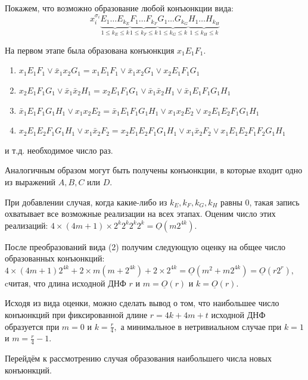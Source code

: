 \documentclass[12pt,a4paper,oneside,fleqn,leqno]{article}
\theoremstyle{definition}
\begin{document}
			Покажем, что возможно образование любой конъюнкции вида:
			$$
			x_i^{\sigma_i} \underbrace{E_1\ldots E_{k_E}}_{1\leqslant k_E \leqslant k}\underbrace{F_1\ldots F_{k_F}}_{1\leqslant k_F \leqslant k}\underbrace{G_1\ldots G_{k_G}}_{1\leqslant k_G \leqslant k}\underbrace{H_1\ldots H_{k_H}}_{1\leqslant k_H \leqslant k}$$\par
			На первом этапе была образована конъюнкция $x_1E_1F_1.$
			\begin{enumerate}\itemsep=0pt
				\item
				$x_1E_1F_1 \vee \bar{x}_1x_2G_1 = x_1E_1F_1 \vee \bar{x}_1x_2G_1 \vee x_2E_1F_1G_1$
				\item
				$x_2E_1F_1G_1 \vee \bar{x}_1\bar{x}_2H_1 = x_2E_1F_1G_1 \vee \bar{x}_1\bar{x}_2H_1 \vee \bar{x}_1E_1F_1G_1H_1$
				\item
				$\bar{x}_1E_1F_1G_1H_1 \vee x_1x_2E_2 = \bar{x}_1E_1F_1G_1H_1 \vee x_1x_2E_2 \vee x_2E_1E_2F_1G_1H_1$
				\item
				$x_2E_1E_2F_1G_1H_1 \vee x_1\bar{x}_2F_2 = x_2E_1E_2F_1G_1H_1 \vee x_1\bar{x}_2F_2 \vee x_1E_1E_2F_1F_2G_1H_1$
			\end{enumerate}
			и т.д. необходимое число раз.\par
			Аналогичным образом могут быть получены конъюнкции, в которые входит одно из выражений $A, B, C$ или $D.$\par
			При добавлении случая, когда какие-либо из $k_E, k_F, k_G, k_H$ равны 0, такая запись охватывает все возможные реализации на всех этапах. Оценим число этих реализаций: $4 \times (4m + 1) \times 2^k2^k2^k2^k = \underline{O}(m2^{4k}).$\par
			После преобразований вида (2) получим следующую оценку на общее число образованных конъюнкций: $4\times (4m + 1)2^{4k} + 2\times m(m + 2^{4k}) + 2\times 2^{4k} = \underline{O}(m^2 + m2^{4k}) = \underline{O}(r2^r),$ cчитая, что длина исходной ДНФ $r$ и $m = \underline{O}(r)$ и $k = \underline{O}(r).$ \par
			Исходя из вида оценки, можно сделать вывод о том, что наибольшее число конъюнкций при фиксированной длине $r = 4k + 4m + t$ исходной ДНФ образуется при $m = 0$ и $k = \frac{r}{4},$ а минимальное в нетривиальном случае при $k = 1$ и $m = \frac{r}{4} - 1.$\par
			Перейдём к рассмотрению случая образования наибольшего числа новых конъюнкций.\par
\end{document}

